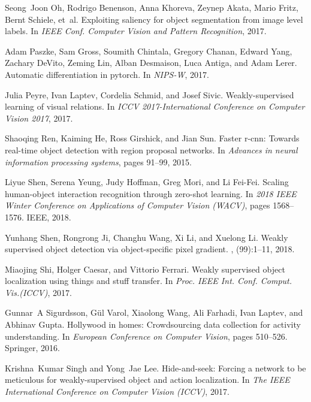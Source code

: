 \documentclass[10pt,twocolumn,letterpaper]{article}
\begin{document}
{\begin{thebibliography}{10}
Seong~Joon Oh, Rodrigo Benenson, Anna Khoreva, Zeynep Akata, Mario Fritz, Bernt
  Schiele, et~al.
\newblock Exploiting saliency for object segmentation from image level labels.
\newblock In {\em IEEE Conf. Computer Vision and Pattern Recognition}, 2017.

Adam Paszke, Sam Gross, Soumith Chintala, Gregory Chanan, Edward Yang, Zachary
  DeVito, Zeming Lin, Alban Desmaison, Luca Antiga, and Adam Lerer.
\newblock Automatic differentiation in pytorch.
\newblock In {\em NIPS-W}, 2017.

Julia Peyre, Ivan Laptev, Cordelia Schmid, and Josef Sivic.
\newblock Weakly-supervised learning of visual relations.
\newblock In {\em ICCV 2017-International Conference on Computer Vision 2017},
  2017.

Shaoqing Ren, Kaiming He, Ross Girshick, and Jian Sun.
\newblock Faster r-cnn: Towards real-time object detection with region proposal
  networks.
\newblock In {\em Advances in neural information processing systems}, pages
  91--99, 2015.

Liyue Shen, Serena Yeung, Judy Hoffman, Greg Mori, and Li Fei-Fei.
\newblock Scaling human-object interaction recognition through zero-shot
  learning.
\newblock In {\em 2018 IEEE Winter Conference on Applications of Computer
  Vision (WACV)}, pages 1568--1576. IEEE, 2018.

Yunhang Shen, Rongrong Ji, Changhu Wang, Xi Li, and Xuelong Li.
\newblock Weakly supervised object detection via object-specific pixel
  gradient.
,
  (99):1--11, 2018.

Miaojing Shi, Holger Caesar, and Vittorio Ferrari.
\newblock Weakly supervised object localization using things and stuff
  transfer.
\newblock In {\em Proc. IEEE Int. Conf. Comput. Vis.(ICCV)}, 2017.

Gunnar~A Sigurdsson, G{\"u}l Varol, Xiaolong Wang, Ali Farhadi, Ivan Laptev,
  and Abhinav Gupta.
\newblock Hollywood in homes: Crowdsourcing data collection for activity
  understanding.
\newblock In {\em European Conference on Computer Vision}, pages 510--526.
  Springer, 2016.

Krishna~Kumar Singh and Yong~Jae Lee.
\newblock Hide-and-seek: Forcing a network to be meticulous for
  weakly-supervised object and action localization.
\newblock In {\em The IEEE International Conference on Computer Vision (ICCV)},
  2017.


\end{thebibliography}}
\end{document}

